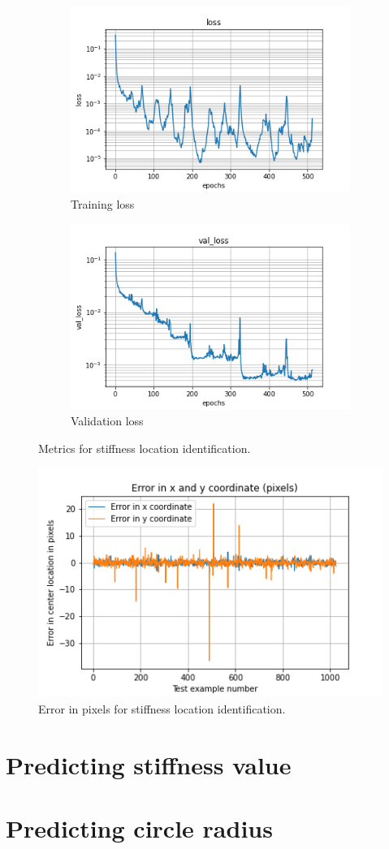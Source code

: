 \documentclass{article}
\begin{document}
%
\begin{figure}
\centering
\begin{subfigure}[b]{0.45\textwidth}
    \centering
    \includegraphics[totalheight=4cm]{circle_id/location/plotloss.png}
    \caption{Training loss}
  \end{subfigure}
%
\begin{subfigure}[b]{0.45\textwidth}
    \centering
    \includegraphics[totalheight=4cm]{circle_id/location/plotval_loss.png}
    \caption{Validation loss}
  \end{subfigure}
%
\caption{\label{fig:locationmetrics} Metrics for stiffness location identification.}
\end{figure}
%
\begin{figure}
\centering
\includegraphics{circle_id/location/plotabserror.png}
\caption{\label{fig:locationerror} Error in pixels for stiffness location identification.}
\end{figure}

\section{Predicting stiffness value}
%
\section{Predicting circle radius}
%
\end{document}
